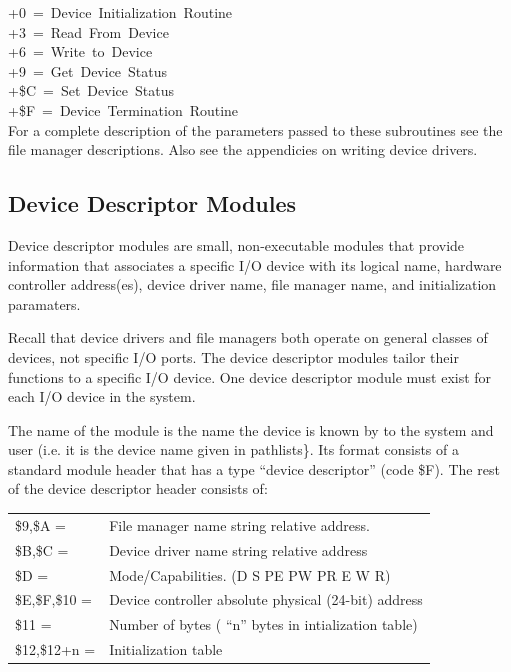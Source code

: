 \documentclass[
]{article}
\newcounter{none} %
\begin{document}
+0~=~Device~Initialization~Routine\\
+3~=~Read~From~Device\\
+6~=~Write~to~Device\\
+9~=~Get~Device~Status\\
+\$C~=~Set~Device~Status\\
+\$F~=~Device~Termination~Routine\\

For a complete description of the parameters passed to these subroutines
see the file manager descriptions. Also see the appendicies on writing
device drivers.

\subsection{Device Descriptor Modules}

Device descriptor modules are small, non-executable modules that provide
information that associates a specific I/O device with its logical name,
hardware controller address(es), device driver name, file manager name,
and initialization paramaters.

Recall that device drivers and file managers both operate on general
classes of devices, not specific I/O ports. The device descriptor
modules tailor their functions to a specific I/O device. One device
descriptor module must exist for each I/O device in the system.

The name of the module is the name the device is known by to the system
and user (i.e. it is the device name given in pathlists\}. Its format
consists of a standard module header that has a type ``device
descriptor'' (code \$F). The rest of the device descriptor header
consists of:

{\def\LTcaptype{none} %
\begin{longtable}[]{@{}
  >{\raggedleft\arraybackslash}p{}
  >{\raggedright\arraybackslash}p{}@{}}
\toprule\noalign{}
\endhead
\bottomrule\noalign{}
\endlastfoot
\$9,\$A = & File manager name string relative address. \\
\$B,\$C = & Device driver name string relative address \\
\$D = & Mode/Capabilities. (D S PE PW PR E W R) \\
\$E,\$F,\$10 = & Device controller absolute physical (24-bit) address \\
\$11 = & Number of bytes ( ``n'' bytes in intialization table) \\
\$12,\$12+n = & Initialization table \\
\end{longtable}
}
\end{document}
